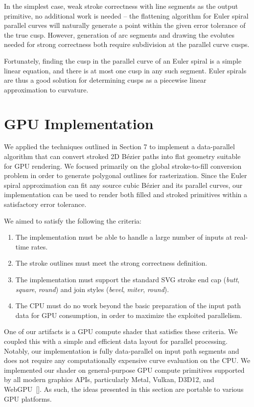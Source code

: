 \documentclass[sigconf, nonacm]{acmart}
\begin{document}
In the simplest case, weak stroke correctness with line segments as the output primitive, no additional work is needed -- the flattening algorithm for Euler spiral parallel curves will naturally generate a point within the given error tolerance of the true cusp. However, generation of arc segments and drawing the evolutes needed for strong correctness both require subdivision at the parallel curve cusps.

Fortunately, finding the cusp in the parallel curve of an Euler spiral is a simple linear equation, and there is at most one cusp in any such segment. Euler spirals are thus a good solution for determining cusps as a piecewise linear approximation to curvature.

\section{GPU Implementation} \label{section:gpu-impl}

We applied the techniques outlined in Section 7 to implement a data-parallel algorithm that can convert stroked 2D Bézier paths into flat geometry suitable for GPU rendering. We focused primarily on the global stroke-to-fill conversion problem in order to generate polygonal outlines for rasterization. Since the Euler spiral approximation can fit any source cubic Bézier and its parallel curves, our implementation can be used to render both filled and stroked primitives within a satisfactory error tolerance.

We aimed to satisfy the following the criteria:
\begin{enumerate}
  \item The implementation must be able to handle a large number of inputs at real-time rates. 
  \item The stroke outlines must meet the strong correctness definition.
  \item The implementation must support the standard SVG stroke end cap (\emph{butt}, \emph{square}, \emph{round}) and join styles (\emph{bevel}, \emph{miter}, \emph{round}).
  \item The CPU must do no work beyond the basic preparation of the input path data for GPU consumption, in order to maximize the exploited parallelism.
\end{enumerate}

One of our artifacts is a GPU compute shader that satisfies these criteria. We coupled this with a simple and efficient data layout for parallel processing. Notably, our implementation is fully data-parallel on input path segments and does not require any computationally expensive curve evaluation on the CPU. We implemented our shader on general-purpose GPU compute primitives supported by all modern graphics APIs, particularly Metal, Vulkan, D3D12, and WebGPU~[]. As such, the ideas presented in this section are portable to various GPU platforms.
\end{document}
